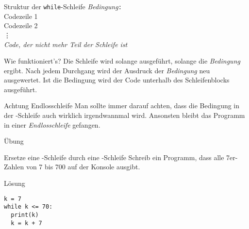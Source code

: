 \begin{frame}

\renewcommand{\baselinestretch}{1.5}
\begin{block}{Struktur der \texttt{while}-Schleife}
	\vspace{2pt}
	\pause {} \pause \textit{Bedingung}\pause\texttt{:} \pause \\
	\spacechar\spacechar Codezeile 1 \pause \\ 
	\spacechar\spacechar Codezeile 2 \pause \\
	\spacechar\spacechar \phantom{Code} \vdots \pause  \\
	\textit{Code, der nicht mehr Teil der Schleife ist}
\end{block}
\vspace{12pt}
\pause 
{}
\renewcommand{\baselinestretch}{1}
\begin{block}{Wie funktioniert's?}
	\vspace{2pt}
	Die Schleife wird solange ausgeführt, solange die \emph{Bedingung}  ergibt. Nach jedem Durchgang wird der Ausdruck der \emph{Bedingung} neu ausgewertet. 
	Ist die Bedingung  wird der Code unterhalb des Schleifenblocks ausgeführt. 
\end{block}

\end{frame}

\begin{frame}
\begin{alertblock}{Achtung Endlosschleife}
	\vspace{2pt}
	Man sollte immer darauf achten, dass die Bedingung in der -Schleife auch wirklich irgendwannmal  wird. Ansonsten bleibt das Programm in einer \emph{Endlosschleife} gefangen. 
\end{alertblock}
\end{frame}


\begin{fragile}{Übung}

\begin{block}{Ersetze eine -Schleife durch eine -Schleife}
\vspace{2pt}
Schreib ein Programm, dass alle 7er-Zahlen von 7 bis 700 auf der Konsole ausgibt. 

\begin{solutionblock}{Lösung}
\begin{verbatim}
k = 7
while k <= 70:
  print(k)
  k = k + 7
\end{verbatim}
\end{solutionblock}
 
\end{block}

\end{fragile}




